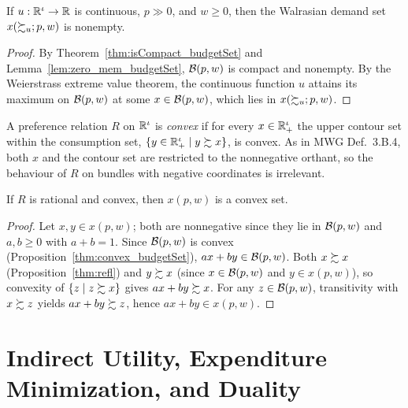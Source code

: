 \begin{theorem}
\label{thm:demand_nonempty}
\leanok
{}
If $u : \mathbb{R}^\iota \to \mathbb{R}$ is continuous, $p \gg 0$, and $w \ge 0$, then the Walrasian
demand set $x(\succsim_u; p, w)$ is nonempty.
\end{theorem}
\begin{proof}
\leanok
By Theorem~\ref{thm:isCompact_budgetSet} and Lemma~\ref{lem:zero_mem_budgetSet}, $\mathcal{B}(p, w)$
is compact and nonempty. By the Weierstrass extreme value theorem, the continuous function
$u$ attains its maximum on $\mathcal{B}(p, w)$ at some $x \in \mathcal{B}(p, w)$, which lies in $x(\succsim_u; p, w)$.
\end{proof}

\begin{definition}
\label{def:convexPref}
\leanok
A preference relation $R$ on $\mathbb{R}^\iota$ is \emph{convex} if for every $x \in \mathbb{R}^\iota_+$
the upper contour set within the consumption set, $\{y \in \mathbb{R}^\iota_+ \mid y \succsim x\}$,
is convex. As in MWG Def.~3.B.4, both $x$ and the contour set are restricted to the
nonnegative orthant, so the behaviour of $R$ on bundles with negative coordinates is
irrelevant.
\end{definition}

\begin{proposition}
\label{thm:convex_demand}
\leanok
{}
If $R$ is rational and convex, then $x(p, w)$ is a convex set.
\end{proposition}
\begin{proof}
\leanok
Let $x, y \in x(p, w)$; both are nonnegative since they lie in $\mathcal{B}(p, w)$ and $a, b \ge 0$ with $a + b = 1$. Since $\mathcal{B}(p, w)$ is convex
(Proposition~\ref{thm:convex_budgetSet}), $ax + by \in \mathcal{B}(p, w)$. Both $x \succsim x$
(Proposition~\ref{thm:refl}) and $y \succsim x$ (since $x \in \mathcal{B}(p, w)$ and $y \in x(p, w)$),
so convexity of $\{z \mid z \succsim x\}$ gives $ax + by \succsim x$. For any $z \in \mathcal{B}(p, w)$,
transitivity with $x \succsim z$ yields $ax + by \succsim z$, hence $ax + by \in x(p, w)$.
\end{proof}


\section{Indirect Utility, Expenditure Minimization, and Duality}
\label{sec:duality}


